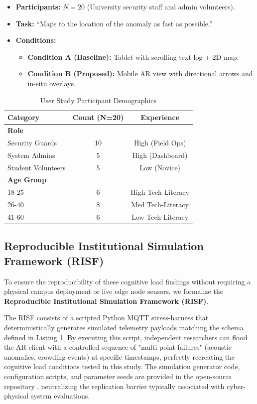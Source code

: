 \documentclass[conference]{IEEEtran}
\begin{document}
\begin{itemize}
    \item \textbf{Participants:} $N=20$ (University security staff and admin volunteers).
    \item \textbf{Task:} ``Maps to the location of the anomaly as fast as possible.''
    \item \textbf{Conditions:}
        \begin{itemize}
            \item \textbf{Condition A (Baseline):} Tablet with scrolling text log + 2D map.
            \item \textbf{Condition B (Proposed):} Mobile AR view with directional arrows and in-situ overlays.
        \end{itemize}
\end{itemize}

\begin{table}[htbp]
\caption{User Study Participant Demographics}
\begin{center}
\begin{tabular}{lcc}
\toprule
\textbf{Category} & \textbf{Count (N=20)} & \textbf{Experience} \\
\midrule
\textbf{Role} & & \\
Security Guards & 10 & High (Field Ops) \\
System Admins & 5 & High (Dashboard) \\
Student Volunteers & 5 & Low (Novice) \\
\midrule
\textbf{Age Group} & & \\
18-25 & 6 & High Tech-Literacy \\
26-40 & 8 & Med Tech-Literacy \\
41-60 & 6 & Low Tech-Literacy \\
\bottomrule
\end{tabular}
\end{center}
\label{tab:participants}
\end{table}

\subsection{Reproducible Institutional Simulation Framework (RISF)}
To ensure the reproducibility of these cognitive load findings without requiring a physical campus deployment or live edge node sensors, we formalize the \textbf{Reproducible Institutional Simulation Framework (RISF)}. 

The RISF consists of a scripted Python MQTT stress-harness that deterministically generates simulated telemetry payloads matching the schema defined in Listing 1. By executing this script, independent researchers can flood the AR client with a controlled sequence of "multi-point failures" (acoustic anomalies, crowding events) at specific timestamps, perfectly recreating the cognitive load conditions tested in this study. The simulation generator code, configuration scripts, and parameter seeds are provided in the open-source repository \cite{scholarmaster_repo}, neutralizing the replication barrier typically associated with cyber-physical system evaluations.
\end{document}
